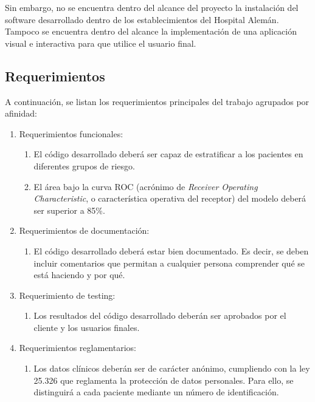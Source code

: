 Sin embargo, no se encuentra dentro del alcance del proyecto la instalación del software desarrollado dentro de los 
establecimientos del Hospital Alemán. Tampoco se encuentra dentro del alcance la implementación de una aplicación 
visual e interactiva para que utilice el usuario final.


\subsection{Requerimientos}
A continuación, se listan los requerimientos principales del trabajo agrupados por afinidad:

\begin{enumerate}
	\item Requerimientos funcionales:
		\begin{enumerate}
			\item El código desarrollado deberá ser 
			capaz de estratificar a los pacientes en diferentes grupos de riesgo.
			\item El área bajo la curva ROC (acrónimo de \emph{Receiver Operating Characteristic}, 
			o característica operativa del receptor) del modelo deberá ser superior a 85\%.
		\end{enumerate}
	\item Requerimientos de documentación:
		\begin{enumerate}
			\item El código desarrollado deberá estar bien documentado. 
			Es decir, se deben incluir comentarios que permitan a cualquier persona comprender
			qué se está haciendo y por qué. 
		\end{enumerate}
	\item Requerimiento de testing:
		\begin{enumerate}
			\item Los resultados del código desarrollado deberán ser aprobados por el cliente 
			y los usuarios finales.
		\end{enumerate}
	\item Requerimientos reglamentarios:
		\begin{enumerate}
			\item Los datos clínicos deberán ser de carácter anónimo, cumpliendo con la ley 25.326 que reglamenta la protección de datos personales. 
			Para ello, se distinguirá a cada paciente mediante un número de identificación.
		\end{enumerate}

\end{enumerate}



